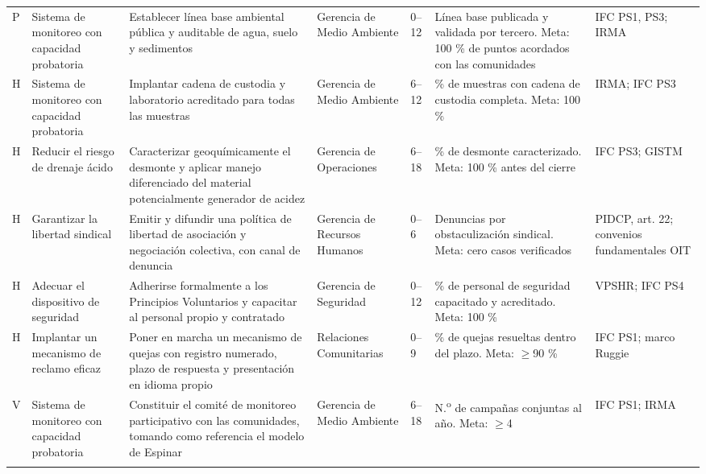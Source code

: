 \begin{landscape}
\begin{footnotesize}
\begin{longtable}{@{}L{0.8cm} L{3.6cm} L{4.6cm} L{2.6cm} L{2.0cm} L{4.6cm} L{3.0cm}@{}}
  P & Sistema de monitoreo con capacidad probatoria &
  Establecer línea base ambiental pública y auditable de agua, suelo y sedimentos &
  Gerencia de Medio Ambiente & 0--12 &
  Línea base publicada y validada por tercero. Meta: 100 \% de puntos acordados
  con las comunidades &
  {IFC} {PS}1, {PS}3; {IRMA} \\
  \addlinespace

  H & Sistema de monitoreo con capacidad probatoria &
  Implantar cadena de custodia y laboratorio acreditado para todas las muestras &
  Gerencia de Medio Ambiente & 6--12 &
  \% de muestras con cadena de custodia completa. Meta: 100 \% &
  {IRMA}; {IFC} {PS}3 \\
  \addlinespace

  H & Reducir el riesgo de drenaje ácido &
  Caracterizar geoquímicamente el desmonte y aplicar manejo diferenciado del
  material potencialmente generador de acidez &
  Gerencia de Operaciones & 6--18 &
  \% de desmonte caracterizado. Meta: 100 \% antes del cierre &
  {IFC} {PS}3; {GISTM} \\
  \addlinespace

  H & Garantizar la libertad sindical &
  Emitir y difundir una política de libertad de asociación y negociación colectiva,
  con canal de denuncia &
  Gerencia de Recursos Humanos & 0--6 &
  Denuncias por obstaculización sindical. Meta: cero casos verificados &
  {PIDCP}, art. 22; convenios fundamentales {OIT} \\
  \addlinespace

  H & Adecuar el dispositivo de seguridad &
  Adherirse formalmente a los Principios Voluntarios y capacitar al personal propio
  y contratado &
  Gerencia de Seguridad & 0--12 &
  \% de personal de seguridad capacitado y acreditado. Meta: 100 \% &
  {VPSHR}; {IFC} {PS}4 \\
  \addlinespace

  H & Implantar un mecanismo de reclamo eficaz &
  Poner en marcha un mecanismo de quejas con registro numerado, plazo de respuesta
  y presentación en idioma propio &
  Relaciones Comunitarias & 0--9 &
  \% de quejas resueltas dentro del plazo. Meta: $\geq$90 \% &
  {IFC} {PS}1; marco Ruggie \\
  \addlinespace

  V & Sistema de monitoreo con capacidad probatoria &
  Constituir el comité de monitoreo participativo con las comunidades, tomando
  como referencia el modelo de Espinar &
  Gerencia de Medio Ambiente & 6--18 &
  N.\textsuperscript{o} de campañas conjuntas al año. Meta: $\geq$4 &
  {IFC} {PS}1; {IRMA} \\
  \addlinespace


\end{longtable}
\end{footnotesize}
\end{landscape}

